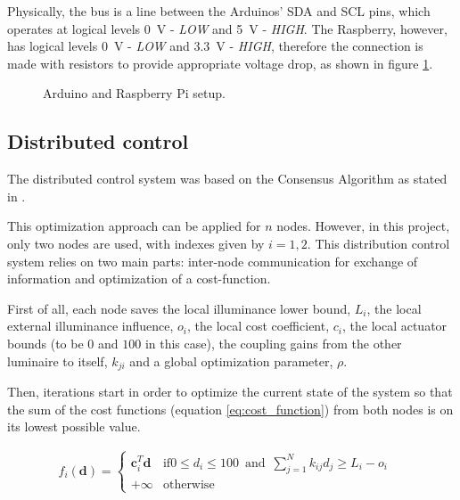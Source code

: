 \documentclass[english,fira]{ist-report}
\begin{document}
Physically, the bus is a line between the Arduinos' SDA and SCL pins, which operates at logical levels \SI{0}{\volt} - \textit{LOW} and \SI{5}{\volt} - \textit{HIGH}. 
The Raspberry, however, has logical levels \SI{0}{\volt} - \textit{LOW} and \SI{3.3}{\volt} - \textit{HIGH}, therefore the connection is made with resistors to provide appropriate voltage drop, as shown in figure \ref{fig:i2c}.

\begin{figure}[ht]
	\centering
	\resizebox{0.5\linewidth}{!}{}
	\caption{Arduino and Raspberry Pi setup.}
	\label{fig:i2c}
\end{figure}

\subsection{Distributed control} \label{sec:distr}

The distributed control system was based on the Consensus Algorithm as stated in \cite{consensusbernardino}.

This optimization approach can be applied for $n$ nodes. However, in this project, only two nodes are used, with indexes given by $i=1, 2$. This distribution control system relies on two main parts: inter-node communication for exchange of information and optimization of a cost-function.

First of all, each node saves the local illuminance lower bound, $L_i$, the local external illuminance influence, $o_i$, the local cost coefficient, $c_i$, the local actuator bounds (to be $0$ and $100$ in this case), the coupling gains from the other luminaire to itself, $k_{ji}$ and a global optimization parameter, $\rho$.

Then, iterations start in order to optimize the current state of the system so that the sum of the cost functions (equation \ref{eq:cost_function}) from both nodes is on its lowest possible value.

\begin{align}
    f_i(\textbf{d}) = 
        \begin{cases}
             \textbf{c}_i^T \textbf{d}  & \text{if} {0 \leq d_i \leq 100 \enspace \text{and} \enspace \sum_{j=1}^{N} k_{ij}d_j \geq L_i - o_i} \\
             +\infty  & \text{otherwise}
       \end{cases} \quad
    \label{eq:cost_function}
\end{align}
\end{document}
